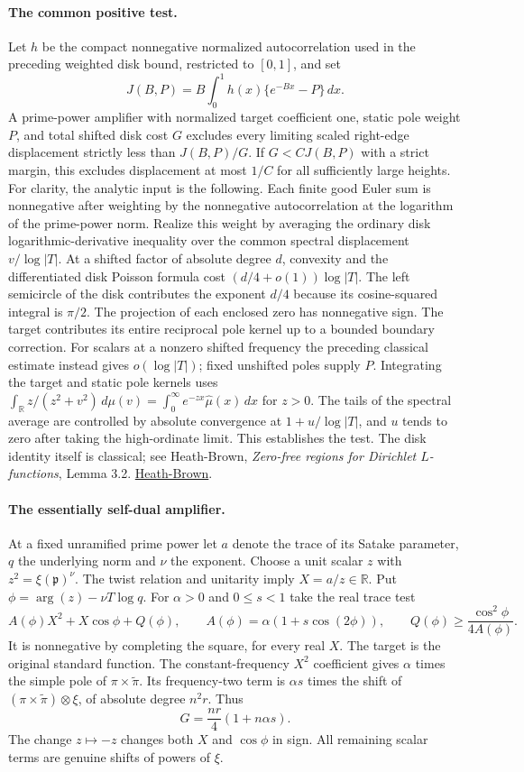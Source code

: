\documentclass[11pt]{article}
\begin{document}
\paragraph{The common positive test.}
Let $h$ be the compact nonnegative normalized autocorrelation used in the preceding weighted disk bound, restricted to $[0,1]$, and set
\[
 J(B,P)=B\int_0^1 h(x)\{e^{-Bx}-P\}\,dx .
\]
A prime-power amplifier with normalized target coefficient one, static pole weight $P$, and total shifted disk cost $G$ excludes every limiting scaled right-edge displacement strictly less than $J(B,P)/G$. If $G<CJ(B,P)$ with a strict margin, this excludes displacement at most $1/C$ for all sufficiently large heights. For clarity, the analytic input is the following. Each finite good Euler sum is nonnegative after weighting by the nonnegative autocorrelation at the logarithm of the prime-power norm. Realize this weight by averaging the ordinary disk logarithmic-derivative inequality over the common spectral displacement $v/\log|T|$. At a shifted factor of absolute degree $d$, convexity and the differentiated disk Poisson formula cost $(d/4+o(1))\log|T|$. The left semicircle of the disk contributes the exponent $d/4$ because its cosine-squared integral is $\pi/2$. The projection of each enclosed zero has nonnegative sign. The target contributes its entire reciprocal pole kernel up to a bounded boundary correction. For scalars at a nonzero shifted frequency the preceding classical estimate instead gives $o(\log|T|)$; fixed unshifted poles supply $P$. Integrating the target and static pole kernels uses $\int_{\mathbb R} z/(z^2+v^2)\,d\mu(v)=\int_0^\infty e^{-zx}\widehat\mu(x)\,dx$ for $z>0$. The tails of the spectral average are controlled by absolute convergence at $1+u/\log|T|$, and $u$ tends to zero after taking the high-ordinate limit. This establishes the test. The disk identity itself is classical; see Heath-Brown, \emph{Zero-free regions for Dirichlet $L$-functions}, Lemma 3.2. \href{https://doi.org/10.1112/plms/s3-64.2.265}{Heath-Brown}.

\paragraph{The essentially self-dual amplifier.}
At a fixed unramified prime power let $a$ denote the trace of its Satake parameter, $q$ the underlying norm and $\nu$ the exponent. Choose a unit scalar $z$ with $z^2=\xi(\mathfrak p)^\nu$. The twist relation and unitarity imply $X=a/z\in\mathbb R$. Put $\phi=\arg(z)-\nu T\log q$. For $\alpha>0$ and $0\le s<1$ take the real trace test
\[
 A(\phi)X^2+X\cos\phi+Q(\phi),\qquad
 A(\phi)=\alpha(1+s\cos(2\phi)),\qquad
 Q(\phi)\ge\frac{\cos^2\phi}{4A(\phi)}.
\]
It is nonnegative by completing the square, for every real $X$. The target is the original standard function. The constant-frequency $X^2$ coefficient gives $\alpha$ times the simple pole of $\pi\times\widetilde\pi$. Its frequency-two term is $\alpha s$ times the shift of $(\pi\times\widetilde\pi)\otimes\xi$, of absolute degree $n^2r$. Thus
\[
                  G=\frac{nr}{4}(1+n\alpha s).
\]
The change $z\mapsto-z$ changes both $X$ and $\cos\phi$ in sign. All remaining scalar terms are genuine shifts of powers of $\xi$.
\end{document}
